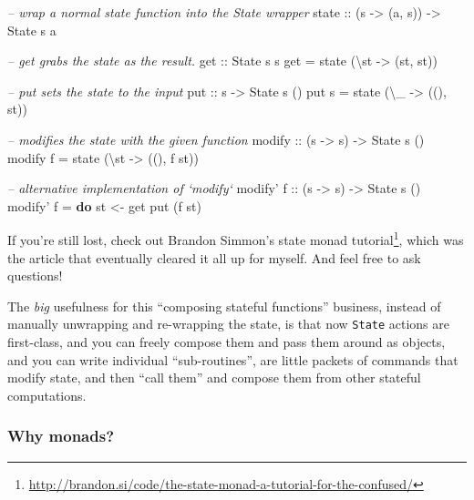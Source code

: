 \documentclass[]{article}
\newenvironment{Shaded}{}{}
\newcommand{\KeywordTok}[1]{\textcolor[rgb]{0.00,0.44,0.13}{\textbf{{#1}}}}
\newcommand{\DataTypeTok}[1]{\textcolor[rgb]{0.56,0.13,0.00}{{#1}}}
\newcommand{\CommentTok}[1]{\textcolor[rgb]{0.38,0.63,0.69}{\textit{{#1}}}}
\newcommand{\OtherTok}[1]{\textcolor[rgb]{0.00,0.44,0.13}{{#1}}}
\newcommand{\FunctionTok}[1]{\textcolor[rgb]{0.02,0.16,0.49}{{#1}}}
\newcommand{\NormalTok}[1]{{#1}}
\renewcommand{\href}[2]{#2\footnote{\url{#1}}}
\begin{document}
\begin{Shaded}
\begin{Highlighting}[]
\CommentTok{-- wrap a normal state function into the State wrapper}
\OtherTok{state ::} \NormalTok{(s }\OtherTok{->} \NormalTok{(a, s)) }\OtherTok{->} \DataTypeTok{State} \NormalTok{s a}

\CommentTok{-- get grabs the state as the result.}
\OtherTok{get ::} \DataTypeTok{State} \NormalTok{s s}
\NormalTok{get }\FunctionTok{=} \NormalTok{state (\textbackslash{}st }\OtherTok{->} \NormalTok{(st, st))}

\CommentTok{-- put sets the state to the input}
\OtherTok{put ::} \NormalTok{s }\OtherTok{->} \DataTypeTok{State} \NormalTok{s ()}
\NormalTok{put s }\FunctionTok{=} \NormalTok{state (\textbackslash{}_ }\OtherTok{->} \NormalTok{((), st))}

\CommentTok{-- modifies the state with the given function}
\OtherTok{modify ::} \NormalTok{(s }\OtherTok{->} \NormalTok{s) }\OtherTok{->} \DataTypeTok{State} \NormalTok{s ()}
\NormalTok{modify f }\FunctionTok{=} \NormalTok{state (\textbackslash{}st }\OtherTok{->} \NormalTok{((), f st))}

\CommentTok{-- alternative implementation of `modify`}
\NormalTok{modify'}\OtherTok{ f ::} \NormalTok{(s }\OtherTok{->} \NormalTok{s) }\OtherTok{->} \DataTypeTok{State} \NormalTok{s ()}
\NormalTok{modify' f }\FunctionTok{=} \KeywordTok{do}
    \NormalTok{st }\OtherTok{<-} \NormalTok{get}
    \NormalTok{put (f st)}
\end{Highlighting}
\end{Shaded}

If you're still lost, check out Brandon Simmon's
\href{http://brandon.si/code/the-state-monad-a-tutorial-for-the-confused/}{state
monad tutorial}, which was the article that eventually cleared it all up for
myself. And feel free to ask questions!

The \emph{big} usefulness for this ``composing stateful functions'' business,
instead of manually unwrapping and re-wrapping the state, is that now
\texttt{State} actions are first-class, and you can freely compose them and pass
them around as objects, and you can write individual ``sub-routines'', are
little packets of commands that modify state, and then ``call them'' and compose
them from other stateful computations.

\subsubsection{Why monads?}\label{why-monads}
\end{document}
